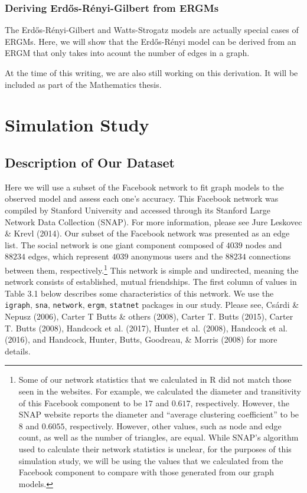 \documentclass[12pt,twoside]{amherstthesis}
\begin{document}
  \subsection{Deriving Erdős-Rényi-Gilbert from
  ERGMs}\label{deriving-erdos-renyi-gilbert-from-ergms}
  
  The Erdős-Rényi-Gilbert and Watts-Strogatz models are actually special
  cases of ERGMs. Here, we will show that the Erdős-Rényi model can be
  derived from an ERGM that only takes into acount the number of edges in
  a graph.
  
  At the time of this writing, we are also still working on this
  derivation. It will be included as part of the Mathematics thesis.
  
  \chapter{Simulation Study}\label{simulation-study}
  
  \section{Description of Our Dataset}\label{description-of-our-dataset}
  
  Here we will use a subset of the Facebook network to fit graph models to
  the observed model and assess each one's accuracy. This Facebook network
  was compiled by Stanford University and accessed through its Stanford
  Large Network Data Collection (SNAP). For more information, please see
  Jure Leskovec \& Krevl (2014). Our subset of the Facebook network was
  presented as an edge list. The social network is one giant component
  composed of \(4039\) nodes and \(88234\) edges, which represent \(4039\)
  anonymous users and the \(88234\) connections between them,
  respectively.\footnote{Some of our network statistics that we calculated
    in R did not match those seen in the websites. For example, we
    calculated the diameter and transitivity of this Facebook component to
    be \(17\) and \(0.617\), respectively. However, the SNAP website
    reports the diameter and ``average clustering coefficient'' to be
    \(8\) and \(0.6055\), respectively. However, other values, such as
    node and edge count, as well as the number of triangles, are equal.
    While SNAP's algorithm used to calculate their network statistics is
    unclear, for the purposes of this simulation study, we will be using
    the values that we calculated from the Facebook component to compare
    with those generated from our graph models.} This network is simple
  and undirected, meaning the network consists of established, mutual
  friendships. The first column of values in Table 3.1 below describes
  some characteristics of this network. We use the \texttt{igraph},
  \texttt{sna}, \texttt{network}, \texttt{ergm}, \texttt{statnet} packages
  in our study. Please see, Csárdi \& Nepusz (2006), Carter T Butts \&
  others (2008), Carter T. Butts (2015), Carter T. Butts (2008), Handcock
  et al. (2017), Hunter et al. (2008), Handcock et al. (2016), and
  Handcock, Hunter, Butts, Goodreau, \& Morris (2008) for more details.
  
\end{document}
